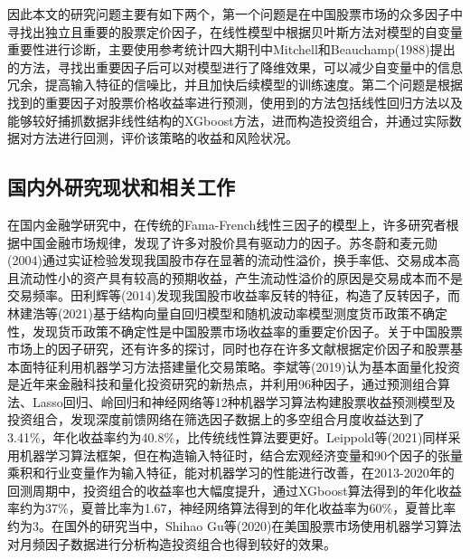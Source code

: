 \documentclass[12pt]{article} %
\begin{document}
	因此本文的研究问题主要有如下两个，第一个问题是在中国股票市场的众多因子中寻找出独立且重要的股票定价因子，在线性模型中根据贝叶斯方法对模型的自变量重要性进行诊断，主要使用参考统计四大期刊中Mitchell和Beauchamp(1988)提出的方法\cite{mitchell1988bayesian}，寻找出重要因子后可以对模型进行了降维效果，可以减少自变量中的信息冗余，提高输入特征的信噪比，并且加快后续模型的训练速度。第二个问题是根据找到的重要因子对股票价格收益率进行预测，使用到的方法包括线性回归方法以及能够较好捕抓数据非线性结构的XGboost方法，进而构造投资组合，并通过实际数据对方法进行回测，评价该策略的收益和风险状况。
	
	
	
	\subsection{国内外研究现状和相关工作}
	
	在国内金融学研究中，在传统的Fama-French线性三因子的模型上，许多研究者根据中国金融市场规律，发现了许多对股价具有驱动力的因子。苏冬蔚和麦元勋(2004)通过实证检验发现我国股市存在显著的流动性溢价，换手率低、交易成本高且流动性小的资产具有较高的预期收益，产生流动性溢价的原因是交易成本而不是交易频率\cite{苏冬蔚2004流动性与资产定价}。田利辉等(2014)发现我国股市收益率反转的特征，构造了反转因子\cite{田利辉2014反转效应与资产定价}，而林建浩等(2021)基于结构向量自回归模型和随机波动率模型测度货币政策不确定性，发现货币政策不确定性是中国股票市场收益率的重要定价因子\cite{林建浩2021货币政策不确定性是中国股票市场的定价因子吗}。关于中国股票市场上的因子研究，还有许多的探讨，同时也存在许多文献根据定价因子和股票基本面特征利用机器学习方法搭建量化交易策略。李斌等(2019)认为基本面量化投资是近年来金融科技和量化投资研究的新热点，并利用96种因子，通过预测组合算法、Lasso回归、岭回归和神经网络等12种机器学习算法构建股票收益预测模型及投资组合，发现深度前馈网络在筛选因子数据上的多空组合月度收益达到了3.41\%，年化收益率约为40.8\%，比传统线性算法要更好\cite{李斌2019机器学习驱动的基本面量化投资研究}。Leippold等(2021)同样采用机器学习算法框架，但在构造输入特征时，结合宏观经济变量和90个因子的张量乘积和行业变量作为输入特征，能对机器学习的性能进行改善，在2013-2020年的回测周期中，投资组合的收益率也大幅度提升，通过XGboost算法得到的年化收益率约为37\%，夏普比率为1.67，神经网络算法得到的年化收益率为60\%，夏普比率约为3\cite{leippold2021machine}。在国外的研究当中，Shihao Gu等(2020)在美国股票市场使用机器学习算法对月频因子数据进行分析构造投资组合也得到较好的效果\cite{gu2020empirical}。
	
\end{document}
